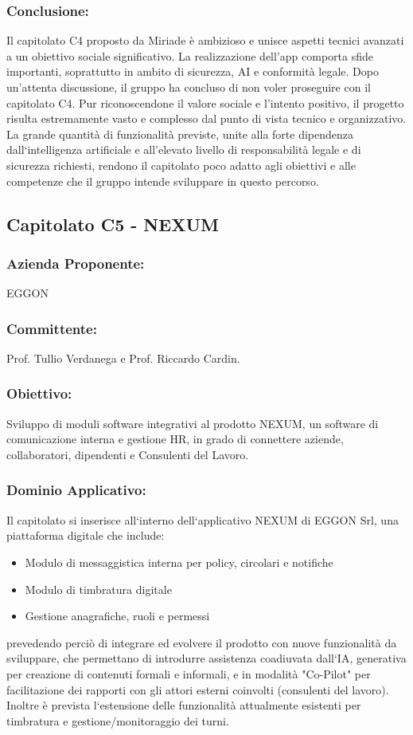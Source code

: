 \documentclass[a4paper,12pt]{article}
\begin{document}
\subsubsection*{Conclusione:}
Il capitolato C4 proposto da Miriade è ambizioso e unisce aspetti tecnici avanzati a un obiettivo sociale significativo.
La realizzazione dell'app comporta sfide importanti, soprattutto in ambito di sicurezza, AI e conformità legale.
Dopo un'attenta discussione, il gruppo ha concluso di non voler proseguire con il capitolato C4.
Pur riconoscendone il valore sociale e l'intento positivo, il progetto risulta estremamente vasto e complesso dal punto di vista tecnico e organizzativo.
La grande quantità di funzionalità previste, unite alla forte dipendenza dall`intelligenza artificiale e all'elevato livello di responsabilità legale e di sicurezza richiesti, rendono il capitolato poco adatto agli obiettivi e alle competenze che il gruppo intende sviluppare in questo percorso.
\vspace{2.0cm}

\subsection{Capitolato C5 - NEXUM}
\subsubsection*{Azienda Proponente:} EGGON
\subsubsection*{Committente:} Prof. Tullio Verdanega e Prof. Riccardo Cardin.
\subsubsection*{Obiettivo:}
Sviluppo di moduli software integrativi al prodotto NEXUM, un software di comunicazione interna e gestione HR, in grado di connettere aziende, collaboratori, dipendenti e Consulenti del Lavoro.
\subsubsection*{Dominio Applicativo:}
Il capitolato si inserisce all`interno dell`applicativo NEXUM di EGGON Srl, una piattaforma digitale che include:
\begin{itemize}
    \item Modulo di messaggistica interna per policy, circolari e notifiche
    \item Modulo di timbratura digitale
    \item Gestione anagrafiche, ruoli e permessi
\end{itemize}
prevedendo perciò di integrare ed evolvere il prodotto con nuove funzionalità da sviluppare, che permettano di introdurre assistenza coadiuvata dall`IA, generativa per creazione di contenuti formali e informali, e in modalità "Co-Pilot" per facilitazione dei rapporti con gli attori esterni coinvolti (consulenti del lavoro). Inoltre è prevista l`estensione delle funzionalità attualmente esistenti per timbratura e gestione/monitoraggio dei turni.
\end{document}
